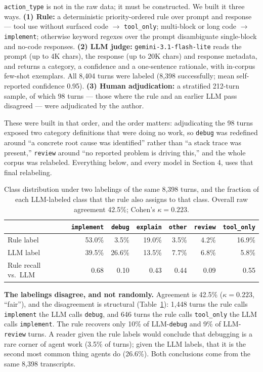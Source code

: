 \documentclass[10pt]{article}
\begin{document}
\texttt{action\_type} is not in the raw data; it must be constructed. We built it
three ways. \textbf{(1) Rule:} a deterministic priority-ordered rule over prompt
and response --- tool use without surfaced code $\rightarrow$ \texttt{tool\_only};
multi-block or long code $\rightarrow$ \texttt{implement}; otherwise keyword
regexes over the prompt disambiguate single-block and no-code responses.
\textbf{(2) LLM judge:} \texttt{gemini-3.1-flash-lite} reads the prompt (up to 4K
chars), the response (up to 20K chars) and response metadata, and returns a
category, a confidence and a one-sentence rationale, with in-corpus few-shot
exemplars. All 8{,}404 turns were labeled (8{,}398 successfully; mean
self-reported confidence 0.95). \textbf{(3) Human adjudication:} a stratified
212-turn sample, of which 98 turns --- those where the rule and an earlier LLM
pass disagreed --- were adjudicated by the author.

These were built in that order, and the order matters: adjudicating the 98 turns
exposed two category definitions that were doing no work, so \texttt{debug} was
redefined around ``a concrete root cause was identified'' rather than ``a stack
trace was present,'' \texttt{review} around ``no reported problem is driving
this,'' and the whole corpus was relabeled. Everything below, and every model in
Section 4, uses that final relabeling.

\begin{table}[t]
\centering
\small
\begin{tabular}{lrrrrrr}
\toprule
& \texttt{implement} & \texttt{debug} & \texttt{explain} & \texttt{other} & \texttt{review} & \texttt{tool\_only} \\
\midrule
Rule label   & 53.0\% & 3.5\%  & 19.0\% & 3.5\% & 4.2\% & 16.9\% \\
LLM label    & 39.5\% & 26.6\% & 13.5\% & 7.7\% & 6.8\% & 5.8\%  \\
\midrule
Rule recall vs.\ LLM & 0.68 & 0.10 & 0.43 & 0.44 & 0.09 & 0.55 \\
\bottomrule
\end{tabular}
\caption{Class distribution under two labelings of the same 8{,}398 turns, and
the fraction of each LLM-labeled class that the rule also assigns to that class.
Overall raw agreement 42.5\%; Cohen's $\kappa = 0.223$.}
\label{tab:labels}
\end{table}

\textbf{The labelings disagree, and not randomly.} Agreement is 42.5\%
($\kappa = 0.223$, ``fair''), and the disagreement is structural
(Table~\ref{tab:labels}): 1{,}448 turns the rule calls \texttt{implement} the LLM
calls \texttt{debug}, and 646 turns the rule calls \texttt{tool\_only} the LLM
calls \texttt{implement}. The rule recovers only 10\% of LLM-\texttt{debug} and
9\% of LLM-\texttt{review} turns. A reader given the rule labels would conclude
that debugging is a rare corner of agent work (3.5\% of turns); given the LLM
labels, that it is the second most common thing agents do (26.6\%). Both
conclusions come from the same 8{,}398 transcripts.
\end{document}
